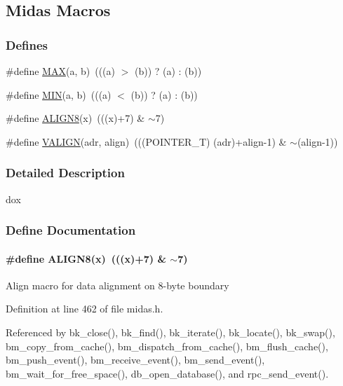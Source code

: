 \subsection{Midas Macros}
\label{group__mmacroh}
\subsubsection*{Defines}
\begin{DoxyCompactItemize}
\item 
\#define \hyperlink{group__mmacroh_gafa99ec4acc4ecb2dc3c2d05da15d0e3f}{MAX}(a, b)~(((a) $>$ (b)) ? (a) : (b))
\item 
\#define \hyperlink{group__mmacroh_ga3acffbd305ee72dcd4593c0d8af64a4f}{MIN}(a, b)~(((a) $<$ (b)) ? (a) : (b))
\item 
\#define \hyperlink{group__mmacroh_ga46bf3ace1698ee72389c30bc61d78686}{ALIGN8}(x)~(((x)+7) \& $\sim$7)
\item 
\#define \hyperlink{group__mmacroh_ga03bfa072452094d4d31ce3d304438f14}{VALIGN}(adr, align)~(((POINTER\_\-T) (adr)+align-\/1) \& $\sim$(align-\/1))
\end{DoxyCompactItemize}


\subsubsection{Detailed Description}
dox 

\subsubsection{Define Documentation}
\paragraph[{ALIGN8}]{\setlength{\rightskip}{0pt plus 5cm}\#define ALIGN8(x)~(((x)+7) \& $\sim$7)}\hfill\label{group__mmacroh_ga46bf3ace1698ee72389c30bc61d78686}
Align macro for data alignment on 8-\/byte boundary 

Definition at line 462 of file midas.h.

Referenced by bk\_\-close(), bk\_\-find(), bk\_\-iterate(), bk\_\-locate(), bk\_\-swap(), bm\_\-copy\_\-from\_\-cache(), bm\_\-dispatch\_\-from\_\-cache(), bm\_\-flush\_\-cache(), bm\_\-push\_\-event(), bm\_\-receive\_\-event(), bm\_\-send\_\-event(), bm\_\-wait\_\-for\_\-free\_\-space(), db\_\-open\_\-database(), and rpc\_\-send\_\-event().
